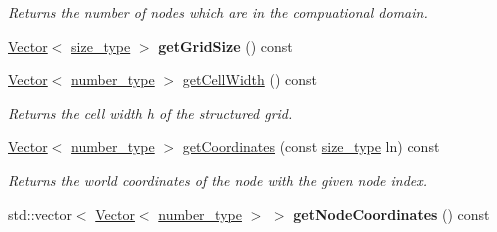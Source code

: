 \begin{DoxyCompactItemize}
\begin{DoxyCompactList}\small\item\em Returns the number of nodes which are in the compuational domain. \item\end{DoxyCompactList}\item 
\hypertarget{classhdnum_1_1SGrid_a3f45476d2463aa8ee9d7cb3c2fc13e86}{
\hyperlink{classhdnum_1_1Vector}{Vector}$<$ \hyperlink{classhdnum_1_1SGrid_aba7c973b280ecd56f211ac4b8d746280}{size\_\-type} $>$ {\bfseries getGridSize} () const }
\label{classhdnum_1_1SGrid_a3f45476d2463aa8ee9d7cb3c2fc13e86}

\item 
\hypertarget{classhdnum_1_1SGrid_af77f316487e41dc0f7bcd972f2c12a85}{
\hyperlink{classhdnum_1_1Vector}{Vector}$<$ \hyperlink{classhdnum_1_1SGrid_ab27de1dac2771512d96a858153db82f5}{number\_\-type} $>$ \hyperlink{classhdnum_1_1SGrid_af77f316487e41dc0f7bcd972f2c12a85}{getCellWidth} () const }
\label{classhdnum_1_1SGrid_af77f316487e41dc0f7bcd972f2c12a85}

\begin{DoxyCompactList}\small\item\em Returns the cell width h of the structured grid. \item\end{DoxyCompactList}\item 
\hypertarget{classhdnum_1_1SGrid_a3d5abab14a7aea4304ebf01a0567c733}{
\hyperlink{classhdnum_1_1Vector}{Vector}$<$ \hyperlink{classhdnum_1_1SGrid_ab27de1dac2771512d96a858153db82f5}{number\_\-type} $>$ \hyperlink{classhdnum_1_1SGrid_a3d5abab14a7aea4304ebf01a0567c733}{getCoordinates} (const \hyperlink{classhdnum_1_1SGrid_aba7c973b280ecd56f211ac4b8d746280}{size\_\-type} ln) const }
\label{classhdnum_1_1SGrid_a3d5abab14a7aea4304ebf01a0567c733}

\begin{DoxyCompactList}\small\item\em Returns the world coordinates of the node with the given node index. \item\end{DoxyCompactList}\item 
\hypertarget{classhdnum_1_1SGrid_a136c4dcd9ff0fd17f4c590ce3334e05f}{
std::vector$<$ \hyperlink{classhdnum_1_1Vector}{Vector}$<$ \hyperlink{classhdnum_1_1SGrid_ab27de1dac2771512d96a858153db82f5}{number\_\-type} $>$ $>$ {\bfseries getNodeCoordinates} () const }
\label{classhdnum_1_1SGrid_a136c4dcd9ff0fd17f4c590ce3334e05f}

\end{DoxyCompactItemize}
